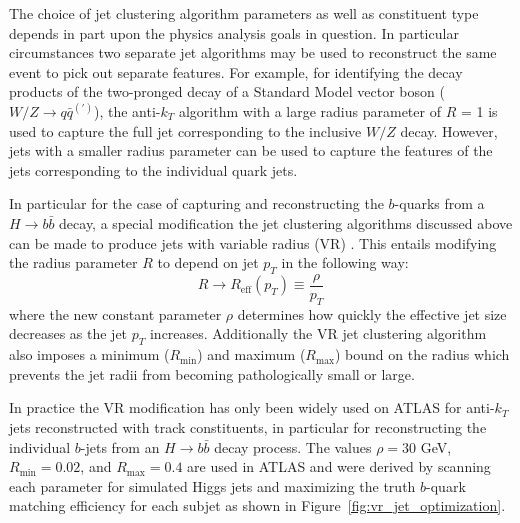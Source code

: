 The choice of jet clustering algorithm parameters as well as constituent type depends in part upon the physics analysis goals in question.
In particular circumstances two separate jet algorithms may be used to reconstruct the same event to pick out separate features.
For example, for identifying the decay products of the two-pronged decay of a Standard Model vector boson ($W/Z \rightarrow q\bar{q}^{(\prime)}$), the anti-$k_T$ algorithm with a large radius parameter of $R$ = 1 is used to capture the full jet corresponding to the inclusive $W/Z$ decay.
However, jets with a smaller radius parameter can be used to capture the features of the jets corresponding to the individual quark jets.

In particular for the case of capturing and reconstructing the $b$-quarks from a $H \rightarrow b\bar{b}$ decay, a special modification the jet clustering algorithms discussed above can be made to produce jets with variable radius (VR) \cite{Krohn:2009zg}.
This entails modifying the radius parameter $R$ to depend on jet $p_T$ in the following way:
\begin{equation}
R \rightarrow R_{\mathrm{eff}}(p_T) \equiv \frac{\rho}{p_T}
\end{equation}
where the new constant parameter $\rho$ determines how quickly the effective jet size decreases as the jet $p_T$ increases.
Additionally the VR jet clustering algorithm also imposes a minimum ($R_{\mathrm{min}}$) and maximum ($R_{\mathrm{max}}$) bound on the radius which prevents the jet radii from becoming pathologically small or large.

In practice the VR modification has only been widely used on ATLAS for anti-$k_T$ jets reconstructed with track constituents, in particular for reconstructing the individual $b$-jets from an $H \rightarrow b\bar{b}$ decay process.
The values $\rho = 30$ GeV, $R_{\mathrm{min}} = 0.02$, and $R_{\mathrm{max}} = 0.4$ are used in ATLAS and were derived by scanning each parameter for simulated Higgs jets and maximizing the truth $b$-quark matching efficiency for each subjet as shown in Figure~\ref{fig:vr_jet_optimization}.

